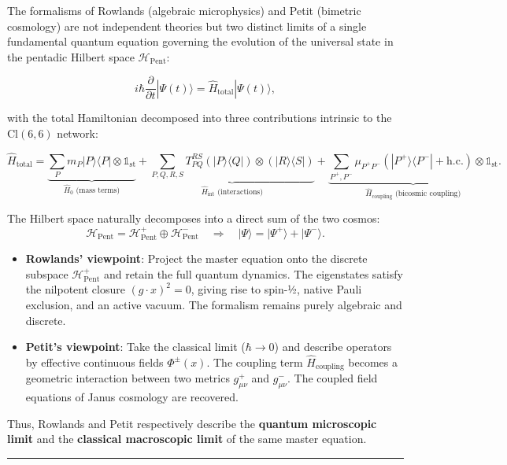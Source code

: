 \documentclass[11pt]{article}
\providecommand{\tightlist}{\setlength{\itemsep}{2pt}\setlength{\parskip}{6pt}}
\let\oldmathcal\mathcal
\renewcommand{\mathcal}[1]{\oldmathcal{#1}}
\providecommand{\tightlist}{%
  \setlength{\itemsep}{2pt}\setlength{\parskip}{6pt}
}
\begin{document}
The formalisms of Rowlands (algebraic microphysics) and Petit (bimetric
cosmology) are not independent theories but two distinct limits of a
single fundamental quantum equation governing the evolution of the
universal state in the pentadic Hilbert space
\(\mathcal{H}_{\text{Pent}}\):

\[
i\hbar \frac{\partial}{\partial t} |\Psi(t)\rangle = \hat{H}_{\text{total}} |\Psi(t)\rangle,
\]

with the total Hamiltonian decomposed into three contributions intrinsic
to the \(\text{Cl}(6,6)\) network:

\[
\hat{H}_{\text{total}} = \underbrace{\sum_P m_P |P\rangle\langle P| \otimes \mathbb{1}_{\text{st}}}_{\hat{H}_0 \text{ (mass terms)}} 
+ \underbrace{\sum_{P,Q,R,S} T^{RS}_{PQ} (|P\rangle\langle Q|) \otimes (|R\rangle\langle S|)}_{\hat{H}_{\text{int}} \text{ (interactions)}} 
+ \underbrace{\sum_{P^+,P^-} \mu_{P^+P^-} (|P^+\rangle\langle P^-| + \text{h.c.}) \otimes \mathbb{1}_{\text{st}}}_{\hat{H}_{\text{coupling}} \text{ (bicosmic coupling)}}.
\]

The Hilbert space naturally decomposes into a direct sum of the two
cosmos: \[
\mathcal{H}_{\text{Pent}} = \mathcal{H}^+_{\text{Pent}} \oplus \mathcal{H}^-_{\text{Pent}} \quad \Rightarrow \quad |\Psi\rangle = |\Psi^+\rangle + |\Psi^-\rangle.
\]

\begin{itemize}
\tightlist
\item
  \textbf{Rowlands' viewpoint}: Project the master equation onto the
  discrete subspace \(\mathcal{H}^+_{\text{Pent}}\) and retain the full
  quantum dynamics. The eigenstates satisfy the nilpotent closure
  \((g\cdot x)^2=0\), giving rise to spin-½, native Pauli exclusion, and
  an active vacuum. The formalism remains purely algebraic and discrete.
\item
  \textbf{Petit's viewpoint}: Take the classical limit (\(\hbar \to 0\))
  and describe operators by effective continuous fields \(\Phi^\pm(x)\).
  The coupling term \(\hat{H}_{\text{coupling}}\) becomes a geometric
  interaction between two metrics \(g_{\mu\nu}^+\) and \(g_{\mu\nu}^-\).
  The coupled field equations of Janus cosmology are recovered.
\end{itemize}

Thus, Rowlands and Petit respectively describe the \textbf{quantum
microscopic limit} and the \textbf{classical macroscopic limit} of the
same master equation.

\begin{center}\rule{0.5\linewidth}{0.5pt}\end{center}
\end{document}

